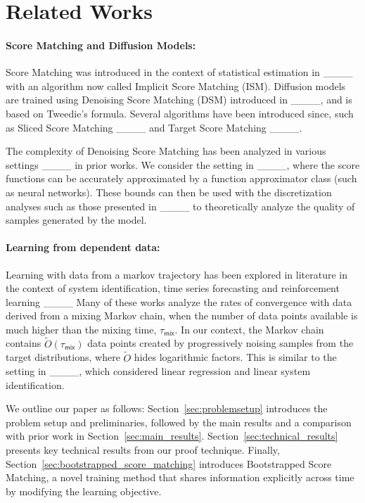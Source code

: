 \section{Related Works}
\label{subsec:related_works}
\paragraph{Score Matching and Diffusion Models:} Score Matching was introduced in the context of statistical estimation in ____ with an algorithm now called Implicit Score Matching (ISM). Diffusion models are trained using Denoising Score Matching (DSM) introduced in ____, and is based on Tweedie's formula. Several algorithms have been introduced since, such as Sliced Score Matching ____ and Target Score Matching ____.

The complexity of Denoising Score Matching has been analyzed in various settings ____ in prior works. We consider the setting in ____, where the score functions can be accurately approximated by a function approximator class (such as neural networks). These bounds can then be used with the discretization analyses such as those presented in ____ to theoretically analyze the quality of samples generated by the model. 

\paragraph{Learning from dependent data:} Learning with data from a markov trajectory has been explored in literature in the context of system identification, time series forecasting and reinforcement learning ____
Many of these works analyze the rates of convergence with data derived from a mixing Markov chain, when the number of data points available is much higher than the mixing time, $\tau_{\mathsf{mix}}$. In our context, the Markov chain contains $\tilde{O}(\tau_{\mathsf{mix}})$ data points created by progressively noising samples from the target distributions, where $\tilde{O}$ hides logarithmic factors. This is similar to the setting in ____, which considered linear regression and linear system identification.

We outline our paper as follows: Section~\ref{sec:problemsetup} introduces the problem setup and preliminaries, followed by the main results and a comparison with prior work in Section~\ref{sec:main_results}. Section~\ref{sec:technical_results} presents key technical results from our proof technique. Finally, Section~\ref{sec:bootstrapped_score_matching} introduces Bootstrapped Score Matching, a novel training method that shares information explicitly across time by modifying the learning objective.